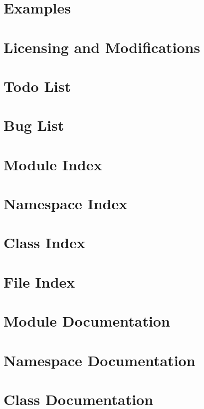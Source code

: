 \documentclass[twoside]{book}
\newcommand{\+}{\discretionary{\mbox{\scriptsize$\hookleftarrow$}}{}{}}
\begin{document}
\chapter{Examples}
\label{page_examples}
\hypertarget{page_examples}{}

\chapter{Licensing and Modifications}
\label{section_license_mod}
\hypertarget{section_license_mod}{}

\chapter{Todo List}
\label{todo}
\hypertarget{todo}{}

\chapter{Bug List}
\label{bug}
\hypertarget{bug}{}

\chapter{Module Index}

\chapter{Namespace Index}

\chapter{Class Index}

\chapter{File Index}

\chapter{Module Documentation}







\chapter{Namespace Documentation}

\chapter{Class Documentation}

























\end{document}
